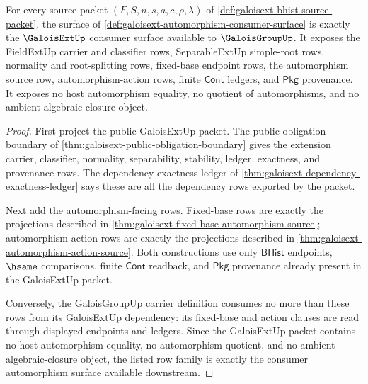 \begin{theorem}
\label{thm:galoisext-galoisgroup-consumer-automorphism-surface}
For every source packet $(F,S,n,s,a,c,\rho,\lambda)$ of
\autoref{def:galoisext-bhist-source-packet}, the surface of
\autoref{def:galoisext-automorphism-consumer-surface} is exactly the
$\GaloisExtUp$ consumer surface available to $\GaloisGroupUp$. It exposes the
FieldExtUp carrier and classifier rows, SeparableExtUp simple-root rows,
normality and root-splitting rows, fixed-base endpoint rows, the automorphism
source row, automorphism-action rows, finite $\mathsf{Cont}$ ledgers, and
$\mathsf{Pkg}$ provenance. It exposes no host automorphism equality, no
quotient of automorphisms, and no ambient algebraic-closure object.
\end{theorem}
\begin{proof}
First project the public GaloisExtUp packet. The public obligation boundary of
\autoref{thm:galoisext-public-obligation-boundary} gives the extension
carrier, classifier, normality, separability, stability, ledger, exactness,
and provenance rows. The dependency exactness ledger of
\autoref{thm:galoisext-dependency-exactness-ledger} says these are all the
dependency rows exported by the packet.

Next add the automorphism-facing rows. Fixed-base rows are exactly the
projections described in
\autoref{thm:galoisext-fixed-base-automorphism-source}; automorphism-action
rows are exactly the projections described in
\autoref{thm:galoisext-automorphism-action-source}. Both constructions use
only $\mathsf{BHist}$ endpoints, $\hsame$ comparisons, finite $\mathsf{Cont}$
readback, and $\mathsf{Pkg}$ provenance already present in the GaloisExtUp
packet.

Conversely, the GaloisGroupUp carrier definition consumes no more than these
rows from its GaloisExtUp dependency: its fixed-base and action clauses are
read through displayed endpoints and ledgers. Since the GaloisExtUp packet
contains no host automorphism equality, no automorphism quotient, and no
ambient algebraic-closure object, the listed row family is exactly the
consumer automorphism surface available downstream.
\end{proof}

